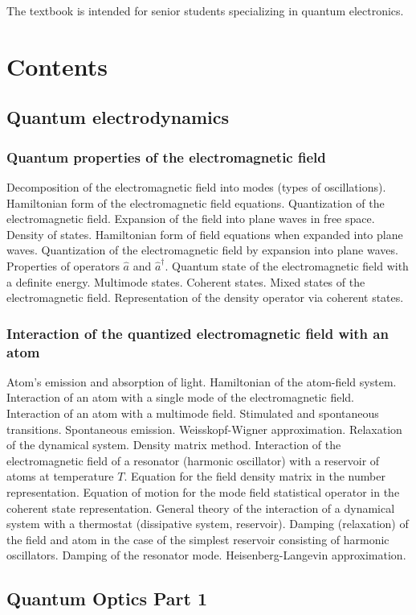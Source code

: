 The textbook is intended for senior students specializing in quantum electronics.

\section{Contents}
\subsection{Quantum electrodynamics}
\subsubsection{Quantum properties of the electromagnetic field}
Decomposition of the electromagnetic field into modes (types of oscillations).
Hamiltonian form of the electromagnetic field equations.
Quantization of the electromagnetic field.
Expansion of the field into plane waves in free space.
Density of states.
Hamiltonian form of field equations when expanded into plane waves.
Quantization of the electromagnetic field by expansion into plane waves.
Properties of operators \( \hat a \) and \( \hat a ^\dag \).
Quantum state of the electromagnetic field with a definite energy.
Multimode states.
Coherent states.
Mixed states of the electromagnetic field.
Representation of the density operator via coherent states.
\subsubsection{Interaction of the quantized electromagnetic field with an atom}
Atom's emission and absorption of light.
Hamiltonian of the atom-field system.
Interaction of an atom with a single mode of the electromagnetic field.
Interaction of an atom with a multimode field. Stimulated and spontaneous transitions.
Spontaneous emission. Weisskopf-Wigner approximation.
Relaxation of the dynamical system. Density matrix method.
Interaction of the electromagnetic field of a resonator (harmonic oscillator) with a reservoir of atoms at temperature \(T\).
Equation for the field density matrix in the number representation.
Equation of motion for the mode field statistical operator in the coherent state representation.
General theory of the interaction of a dynamical system with a thermostat (dissipative system, reservoir).
Damping (relaxation) of the field and atom in the case of the simplest reservoir consisting of harmonic oscillators.
Damping of the resonator mode. Heisenberg-Langevin approximation.

\subsection{Quantum Optics Part 1}
